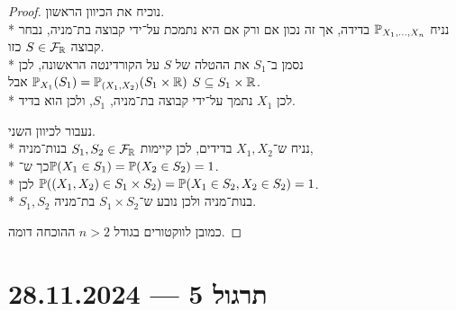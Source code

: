 \begin{proof}
	נוכיח את הכיוון הראשון. \\*
	נניח $\mathbb{P}_{X_1, \dots, X_n}$ בדידה, אך זה נכון אם ורק אם היא נתמכת על־ידי קבוצה בת־מניה, נבחר קבוצה $S \in \mathcal{F}_{\mathbb{R}}$ כזו. \\*
	נסמן ב־$S_1$ את ההטלה של $S$ על הקורדינטה הראשונה, לכן $\mathbb{P}_{X_1}(S_1) = \mathbb{P}_{(X_1, X_2)}(S_1 \times \mathbb{R})$ אבל $S \subseteq S_1 \times \mathbb{R}$. \\*
	לכן $X_1$ נתמך על־ידי קבוצה בת־מניה, $S_1$, ולכן הוא בדיד.

	נעבור לכיוון השני. \\*
	נניח ש־$X_1, X_2$ בדידים, לכן קיימות $S_1, S_2 \in \mathcal{F}_{\mathbb{R}}$ בנות־מניה, \\*
	כך ש־$\mathbb{P}(X_1 \in S_1) = \mathbb{P}(X_2 \in S_2) = 1$. \\*
	לכן $\mathbb{P}((X_1, X_2) \in S_1 \times S_2) = \mathbb{P}(X_1 \in S_2, X_2 \in S_2) = 1$. \\*
	$S_1, S_2$ בנות־מניה ולכן נובע ש־$S_1 \times S_2$ בת־מניה.

	כמובן לווקטורים בגודל $n > 2$ ההוכחה דומה.
\end{proof}

\section{תרגול 5 --- 28.11.2024}


